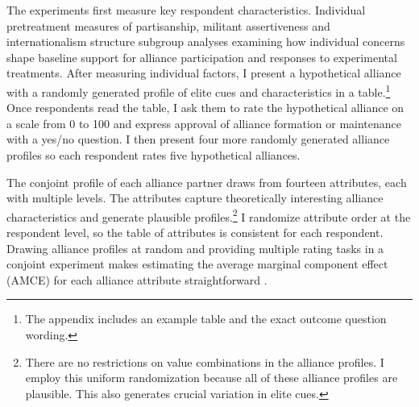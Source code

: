 \documentclass[12pt]{article}
\begin{document}
The experiments first measure key respondent characteristics.  
Individual pretreatment measures of partisanship, militant assertiveness and internationalism structure subgroup analyses examining how individual concerns shape baseline support for alliance participation and responses to experimental treatments. 
After measuring individual factors, I present a hypothetical alliance with a randomly generated profile of elite cues and characteristics in a table.\footnote{The appendix includes an example table and the exact outcome question wording.} 
Once respondents read the table, I ask them to rate the hypothetical alliance on a scale from 0 to 100 and express approval of alliance formation or maintenance with a yes/no question. 
I then present four more randomly generated alliance profiles so each respondent rates five hypothetical alliances.


The conjoint profile of each alliance partner draws from fourteen attributes, each with multiple levels. 
The attributes capture theoretically interesting alliance characteristics and generate plausible profiles.\footnote{There are no restrictions on value combinations in the alliance profiles. I employ this uniform randomization because all of these alliance profiles are plausible. This also generates crucial variation in elite cues.}
I randomize attribute order at the respondent level, so the table of attributes is consistent for each respondent. 
Drawing alliance profiles at random and providing multiple rating tasks in a conjoint experiment makes estimating the average marginal component effect (AMCE) for each alliance attribute straightforward \citep{Hainmuelleretal2014}. 
\end{document}
